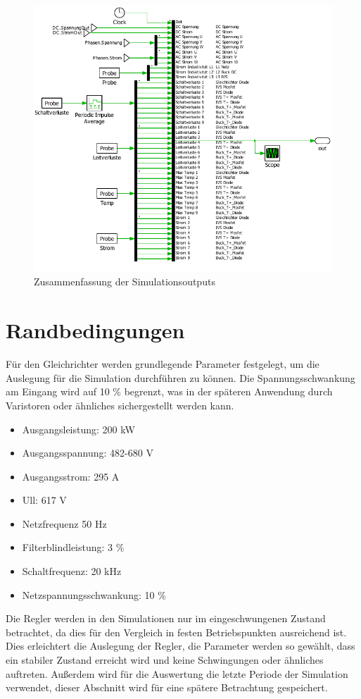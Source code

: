 \begin{figure}
\centering
\includegraphics[width=0.9\linewidth]{content/Grafiken/Plecs_Out}
\caption{Zusammenfassung der Simulationsoutputs}
\label{fig:plecsout}
\end{figure}


\section{Randbedingungen}
Für den Gleichrichter werden grundlegende Parameter festgelegt, um die Auslegung für die Simulation durchführen zu können. Die Spannungsschwankung am Eingang wird auf 10 \% begrenzt, was in der späteren Anwendung durch Varistoren oder ähnliches sichergestellt werden kann.

\begin{itemize}
\item Ausgangsleistung: 200 kW
\item Ausgangsspannung: 482-680 V
\item Ausgangsstrom: 	295 A
\item \gls{Ull}:		617 V
\item Netzfrequenz		50 Hz
\item Filterblindleistung: 3 \%
\item Schaltfrequenz: 20 kHz
\item Netzspannungsschwankung: 10 \%
\end{itemize}

Die Regler werden in den Simulationen nur im eingeschwungenen Zustand betrachtet, da dies für den Vergleich in festen Betriebspunkten ausreichend ist. Dies erleichtert die Auslegung der Regler, die Parameter werden so gewählt, dass ein stabiler Zustand erreicht wird und keine Schwingungen oder ähnliches auftreten. Außerdem wird für die Auswertung die letzte Periode der Simulation verwendet, dieser Abschnitt wird für eine spätere Betrachtung gespeichert.

